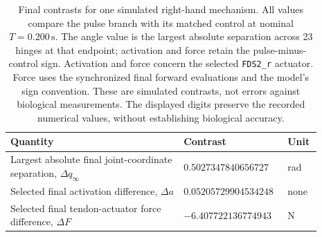 \begin{table}[htbp]
\centering
\caption{Final contrasts for one simulated right-hand mechanism. All values compare the pulse branch with its matched control at nominal $T=0.200\,\mathrm{s}$. The angle value is the largest absolute separation across 23 hinges at that endpoint; activation and force retain the pulse-minus-control sign. Activation and force concern the selected \texttt{FDS2\_r} actuator. Force uses the synchronized final forward evaluations and the model's sign convention. These are simulated contrasts, not errors against biological measurements. The displayed digits preserve the recorded numerical values, without establishing biological accuracy.\cite{myohandNumericalRecord20261105}}
\label{tab:myohand-numerical-response}
\begin{tabular}{p{0.53\linewidth}p{0.26\linewidth}p{0.10\linewidth}}
\hline
Quantity & Contrast & Unit \\
\hline
Largest absolute final joint-coordinate separation, $\Delta q_{\infty}$ & $0.5027347840656727$ & rad \\
Selected final activation difference, $\Delta a$ & $0.05205729904534248$ & none \\
Selected final tendon-actuator force difference, $\Delta F$ & $-6.407722136774943$ & N \\
\hline
\end{tabular}
\end{table}
